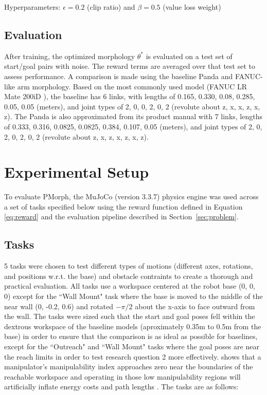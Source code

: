 \documentclass[letterpaper, 10 pt, conference]{ieeeconf}  %
\begin{document}
Hyperparameters: \(\epsilon=0.2\) (clip ratio) and \(\beta=0.5\) (value loss weight)

\subsection{Evaluation}

After training, the optimized morphology \(\theta^*\) is evaluated on a test set of start/goal pairs with noise.
The reward terms are averaged over that test set to assess performance.
A comparison is made using the baseline Panda and FANUC-like arm morphology.
Based on the most commonly used model (FANUC LR Mate 200iD \cite{fanuc2024lrmate}), the baseline has 6 links, with lengths of 0.165, 0.330, 0.08, 0.285, 0.05, 0.05 (meters), and joint types of 2, 0, 0, 2, 0, 2 (revolute about z, x, x, z, x, z).
The Panda is also approximated from its product manual \cite{franka2024research3} with 7 links, lengths of 0.333, 0.316, 0.0825, 0.0825, 0.384, 0.107, 0.05 (meters), and joint types of 2, 0, 2, 0, 2, 0, 2 (revolute about z, x, z, x, z, x, z).

\section{Experimental Setup}

To evaluate PMorph, the MuJoCo (version 3.3.7) physics engine was used across a set of tasks specified below using the reward function defined in Equation \eqref{eq:reward} and the evaluation pipeline described in Section~\ref{sec:problem}.

\subsection{Tasks}

5 tasks were chosen to test different types of motions (different axes, rotations, and positions w.r.t. the base) and obstacle contraints to create a thorough and practical evaluation. 
All tasks use a workspace centered at the robot base (0, 0, 0) except for the ``Wall Mount" task where the base is moved to the middle of the near wall (0, -0.2, 0.6) and rotated $-\pi/2$ about the x-axis to face outward from the wall.
The tasks were sized such that the start and goal poses fell within the dextrous workspace of the baseline models (aproximately 0.35m to 0.5m from the base) in order to ensure that the comparison is as ideal as possible for baselines, except for the ``Outreach" and ``Wall Mount" tasks where the goal poses are near the reach limits in order to test research question 2 more effectively.
\cite{yoshikawa1985manipulability} shows that a manipulator's manipulability index approaches zero near the boundaries of the reachable workspace and operating in those low manipulability regions will artificially inflate energy costs and path lengths \cite{vahrenkamp2012manipulability}.
The tasks are as follows:
\end{document}
